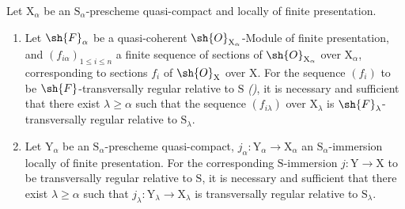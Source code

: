 \begin{proposition}[19.8.2]
\label{IV.19.8.2}
Let $\mathrm{X}_\alpha$ be an $\mathrm{S}_\alpha$-prescheme quasi-compact and locally of finite presentation.
\begin{enumerate}
\item[\rm(i)] Let $\sh{F}_\alpha$ be a quasi-coherent $\sh{O}_{\mathrm{X}_\alpha}$-Module of finite presentation, and $(f_{i\alpha})_{1\leqslant i\leqslant n}$ a finite sequence of sections of $\sh{O}_{\mathrm{X}_\alpha}$ over $\mathrm{X}_\alpha$, corresponding to sections $f_i$ of $\sh{O}_\mathrm{X}$ over $\mathrm{X}$. For the sequence $(f_i)$ to be $\sh{F}$-transversally regular relative to $\mathrm{S}$ \emph{()}, it is necessary and sufficient that there exist $\lambda\geqslant\alpha$ such that the sequence $(f_{i\lambda})$ over $\mathrm{X}_\lambda$ is $\sh{F}_\lambda$-transversally regular relative to $\mathrm{S}_\lambda$.
\item[\rm(ii)] Let $\mathrm{Y}_\alpha$ be an $\mathrm{S}_\alpha$-prescheme quasi-compact, $j_\alpha:\mathrm{Y}_\alpha\to\mathrm{X}_\alpha$ an $\mathrm{S}_\alpha$-immersion locally of finite presentation. For the corresponding $\mathrm{S}$-immersion $j:\mathrm{Y}\to\mathrm{X}$ to be transversally regular relative to $\mathrm{S}$, it is necessary and sufficient that there exist $\lambda\geqslant\alpha$ such that $j_\lambda:\mathrm{Y}_\lambda\to\mathrm{X}_\lambda$ is transversally regular relative to $\mathrm{S}_\lambda$.
\end{enumerate}
\end{proposition}

